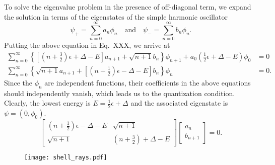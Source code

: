 To solve the eigenvalue problem in the presence of off-diagonal term, we expand the solution in terms of the eigenstates of the simple harmonic oscillator
%
\begin{equation}
  \psi_{+} = \sum_{n= 0}^{\infty} a_{n}\phi_{n}
  \quad\text{and}\quad
  \psi_{-} = \sum_{n = 0}^{\infty} b_{n}\phi_{n}.
\end{equation}
%
Putting the above equation in Eq.~XXX, we arrive at
%
\begin{equation}
   \begin{aligned}
     \sum_{n = 0}^{\infty} \left\{\left[\left(n +  \tfrac{3}{2}\right)\epsilon + \Delta - E\right]a_{n + 1} + \sqrt{n + 1}b_{n}\right\}\phi_{n+1}  + a_{0}\left(\tfrac{1}{2}\epsilon + \Delta - E\right)\phi_{0}&= 0\\
     \sum_{n = 0}^{\infty} \left\{\sqrt{n + 1}a_{n+1} + \left[\left(n +  \tfrac{1}{2}\right)\epsilon - \Delta - E\right]b_{n}\right\}\phi_{n} &= 0.
   \end{aligned}
\end{equation}
%
Since the $\phi_{n}$ are independent functions, their coefficients in the above equations should independently vanish, which leads us to the quantization condition.
Clearly, the lowest energy is $E = \tfrac{1}{2}\epsilon + \Delta$ and the associated eigenstate is $\psi = (0, \phi_{0})$.
%
\begin{equation}
  \begin{bmatrix}
    \left(n + \tfrac{1}{2}\right)\epsilon - \Delta - E & \sqrt{n + 1}\\
    \sqrt{n + 1} & \left(n + \tfrac{3}{2}\right) + \Delta - E
  \end{bmatrix}
  \begin{bmatrix}
    a_{n}\\
    b_{n + 1}
  \end{bmatrix}
  = 0.
\end{equation}
%



\begin{figure}
  \begin{center}
    \texttt{[image: shell\_rays.pdf]}
  \end{center}
\end{figure}

